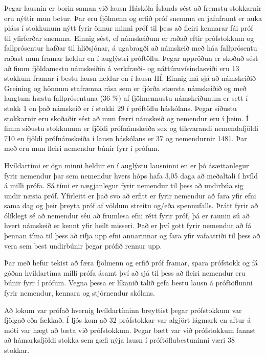 \documentclass[12pt]{article}
\begin{document}
Þegar lausnin er borin saman við lausn Háskóla Íslands sést að fremstu stokkarnir eru nýttir mun betur. Þar eru fjölmenn og erfið próf snemma en jafnframt er auka pláss í stokkunum nýtt fyrir önnur minni próf til þess að fleiri kennarar fái próf til yfirferðar snemma. 
\medskip
Einnig sést, ef námskeiðum er raðað eftir prófstokkum og fallprósentur hafðar til hliðsjónar, á ugabragði að námskeið með háa fallprósentu raðast mun framar heldur en í auglýstri próftöflu.  
\medskip
Þegar uppröðun er skoðuð sést að fimm fjöldamestu námskeiðin á verkfræði- og náttúruvísindasviði eru 13 stokkum framar í bestu lausn heldur en í lausn HÍ. Einnig má sjá að námskeiðið Greining og hönnum stafrænna rása sem er fjórða stærsta námskeiðið og með langtum hæstu fallprósentuna (36 \%) af fjölmennustu námskeiðunum er sett í stokk 1 en það námskeið er í stokki 29 í próftöflu háskólans.  
\medskip
Þegar síðustu stokkarnir eru skoðaðir sést að mun færri námskeið og nemendur eru í þeim. Í fimm síðustu stokkunum er fjöldi prófnámskeiða sex og tilsvarandi nemendafjöldi 710 en fjöldi prófnámskeiða í lausn háskólans er 37 og nemendurnir 1481. Þar með eru mun fleiri nemendur búnir fyrr í prófum. 
\medskip

Hvíldartími er ögn minni heldur en í auglýstu lausninni en er þó ásættanlegur fyrir nemendur þar sem nemendur hvers hóps hafa 3,05 daga að meðaltali í hvíld á milli prófa. Sá tími er nægjanlegur fyrir nemendur til þess að undirbúa sig undir næsta próf. Yfirleitt er það svo að erfitt er fyrir nemendur að fara yfir efni sama dag og þeir þreyta próf af völdum streitu og/eða spennufalls. Þrátt fyrir að ólíklegt sé að nemendur séu að frumlesa efni rétt fyrir próf, þá er raunin sú að hvert námskeið er kennt yfir heilt misseri. Það er því gott fyrir nemendur að fá þennan tíma til þess að rifja upp efni annarinnar og fara yfir vafaatriði til þess að vera sem best undirbúnir þegar prófið rennur upp.
\medskip 

Þar með hefur tekist að færa fjölmenn og erfið próf framar, spara prófstokk og fá góðan hvíldartíma milli prófa ásamt því að sjá til þess að fleiri nemendur eru búnir fyrr í prófum. Vegna þessa er líkanið talið gefa bestu lausn á próftöflunni fyrir nemendur, kennara og stjórnendur skólans. 

Að lokum var prófað hvernig hvíldartíminn breyttist þegar prófstokkum var fjölgað eða fækkað. Í ljós kom að 32 prófstokkar var algjört lágmark en aftur á móti var hægt að bæta við prófstokkum. Þegar bætt var við prófstokkum fannst að hámarksfjöldi stokka sem gæfi nýja lausn í próftöflubestuninni væri 38 stokkar. 
\end{document}
